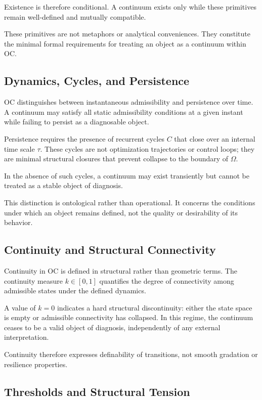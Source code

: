 Existence is therefore conditional.
A continuum exists only while these primitives remain well-defined and
mutually compatible.

These primitives are not metaphors or analytical conveniences.
They constitute the minimal formal requirements for treating an object
as a continuum within OC.

\subsection{Dynamics, Cycles, and Persistence}

OC distinguishes between instantaneous admissibility and persistence
over time.
A continuum may satisfy all static admissibility conditions at a given
instant while failing to persist as a diagnosable object.

Persistence requires the presence of recurrent cycles $C$ that close
over an internal time scale $\tau$.
These cycles are not optimization trajectories or control loops; they
are minimal structural closures that prevent collapse to the boundary of
$\Omega$.

In the absence of such cycles, a continuum may exist transiently but
cannot be treated as a stable object of diagnosis.

This distinction is ontological rather than operational.
It concerns the conditions under which an object remains defined, not
the quality or desirability of its behavior.

\subsection{Continuity and Structural Connectivity}

Continuity in OC is defined in structural rather than geometric terms.
The continuity measure $k \in [0,1]$ quantifies the degree of connectivity
among admissible states under the defined dynamics.

A value of $k = 0$ indicates a hard structural discontinuity: either the
state space is empty or admissible connectivity has collapsed.
In this regime, the continuum ceases to be a valid object of diagnosis,
independently of any external interpretation.

Continuity therefore expresses definability of transitions, not smooth
gradation or resilience properties.

\subsection{Thresholds and Structural Tension}

